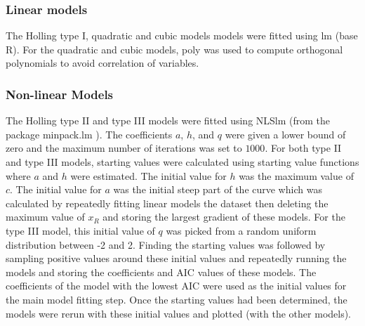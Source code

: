 \documentclass{article}
\begin{document}
\subsubsection{Linear models}
 The Holling type I, quadratic and cubic models models were fitted using lm (base R). For the quadratic and cubic models, poly was used to compute orthogonal polynomials to avoid correlation of variables.
\subsubsection{Non-linear Models}
The Holling type II and type III models were fitted using NLSlm (from the package minpack.lm \cite{Elzhov2016}). The coefficients $a$, $h$, and $q$ were given a lower bound of zero and the maximum number of iterations was set to $1000$. For both type II and type III models, starting values were calculated using starting value functions where $a$ and $h$ were estimated. The initial value for $h$ was the maximum value of $c$. The initial value for $a$ was the initial steep part of the curve which was calculated by repeatedly fitting linear models the dataset then deleting the maximum value of $x_R$ and storing the largest gradient of these models. For the type III model, this initial value of $q$ was picked from a random uniform distribution between -2 and 2. Finding the starting values was followed by sampling positive values around these initial values and repeatedly running the models and storing the coefficients and AIC values of these models. The coefficients of the model with the lowest AIC were used as the initial values for the main model fitting step. 
Once the starting values had been determined, the models were rerun with these initial values and plotted (with the other models). 
\end{document}
